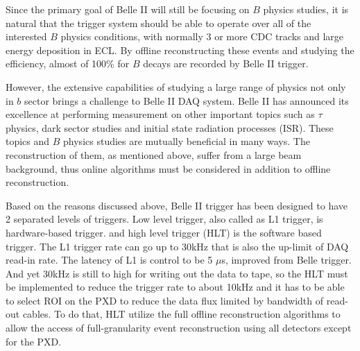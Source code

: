 Since the primary goal of Belle II will still be focusing on $B$ physics studies, it is natural that the trigger system should be able to operate over all of the interested $B$ physics conditions, with normally 3 or more CDC tracks and large energy deposition in ECL. By offline reconstructing these events and studying the efficiency, almost of 100\% for $B$ decays are recorded by Belle II trigger. 

However, the extensive capabilities of studying a large range of physics not only in $b$ sector brings a challenge to Belle II DAQ system. Belle II has announced its excellence at performing measurement on other important topics such as $\tau$ physics, dark sector studies and initial state radiation processes (ISR). These topics and $B$ physics studies are mutually beneficial in many ways. The reconstruction of them, as mentioned above, suffer from a large beam background, thus online algorithms must be considered in addition to offline reconstruction. 

Based on the reasons discussed above, Belle II trigger has been designed to have 2 separated levels of triggers. Low level trigger, also called as L1 trigger, is hardware-based trigger. and high level trigger (HLT) is the software based trigger.
The L1 trigger rate can go up to 30kHz that is also the up-limit of DAQ read-in rate. The latency of L1 is control to be 5 $\mu$s, improved from Belle trigger.
And yet 30kHz is still to high for writing out the data to tape, so the HLT must be implemented to reduce the trigger rate to about 10kHz and it has to be able to select ROI on the PXD to reduce the data flux limited by bandwidth of read-out cables. To do that, HLT utilize  the full offline reconstruction algorithms to allow the access of full-granularity
event reconstruction using all detectors except for the PXD. 

